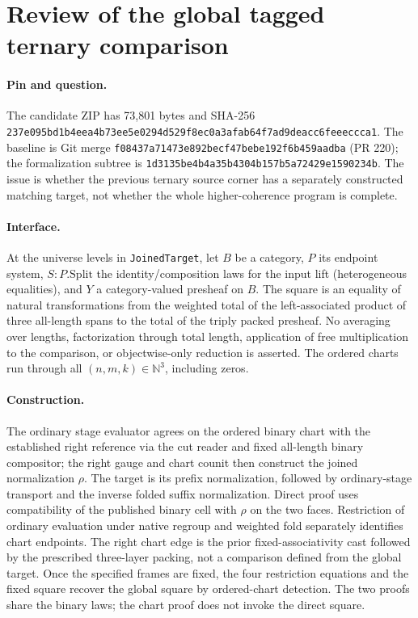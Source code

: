 \documentclass{article}
\begin{document}
\section*{Review of the global tagged ternary comparison}
\paragraph{Pin and question.}
The candidate ZIP has 73,801 bytes and SHA-256
\texttt{237e095bd1b4eea4b73ee5e0294d529f8ec0a3afab64f7ad9deacc6feeeccca1}.
The baseline is Git merge \texttt{f08437a71473e892becf47bebe192f6b459aadba}
(PR 220); the formalization subtree is \texttt{1d3135be4b4a35b4304b157b5a72429e1590234b}.
The issue is whether the previous ternary source corner has a separately constructed matching target, not whether the whole higher-coherence program is complete.
\paragraph{Interface.} At the universe levels in \texttt{JoinedTarget}, let $B$ be a category, $P$ its endpoint system, $S:P.\mathrm{Split}$ the identity/composition laws for the input lift (heterogeneous equalities), and $Y$ a category-valued presheaf on $B$. The square is an equality of natural transformations from the weighted total of the left-associated product of three all-length spans to the total of the triply packed presheaf. No averaging over lengths, factorization through total length, application of free multiplication to the comparison, or objectwise-only reduction is asserted. The ordered charts run through all $(n,m,k)\in\mathbb N^3$, including zeros.
\paragraph{Construction.} The ordinary stage evaluator agrees on the ordered binary chart with the established right reference via the cut reader and fixed all-length binary compositor; the right gauge and chart counit then construct the joined normalization $\rho$. The target is its prefix normalization, followed by ordinary-stage transport and the inverse folded suffix normalization. Direct proof uses compatibility of the published binary cell with $\rho$ on the two faces. Restriction of ordinary evaluation under native regroup and weighted fold separately identifies chart endpoints. The right chart edge is the prior fixed-associativity cast followed by the prescribed three-layer packing, not a comparison defined from the global target. Once the specified frames are fixed, the four restriction equations and the fixed square recover the global square by ordered-chart detection. The two proofs share the binary laws; the chart proof does not invoke the direct square.
\end{document}
